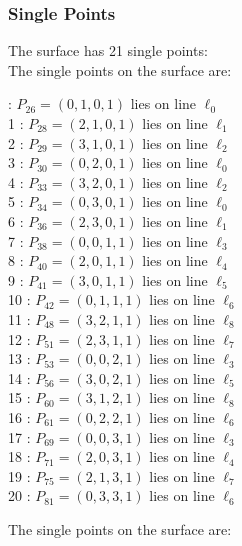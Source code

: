 \documentclass{article}
\begin{document}
{\subsubsection*{Single Points}
The surface has 21 single points:\\
The single points on the surface are:\\
\begin{multicols}{2}
 : $P_{26}=( 0, 1, 0, 1 )$ lies on line $\ell_{0}$\\
1 : $P_{28}=( 2, 1, 0, 1 )$ lies on line $\ell_{1}$\\
2 : $P_{29}=( 3, 1, 0, 1 )$ lies on line $\ell_{2}$\\
3 : $P_{30}=( 0, 2, 0, 1 )$ lies on line $\ell_{0}$\\
4 : $P_{33}=( 3, 2, 0, 1 )$ lies on line $\ell_{2}$\\
5 : $P_{34}=( 0, 3, 0, 1 )$ lies on line $\ell_{0}$\\
6 : $P_{36}=( 2, 3, 0, 1 )$ lies on line $\ell_{1}$\\
7 : $P_{38}=( 0, 0, 1, 1 )$ lies on line $\ell_{3}$\\
8 : $P_{40}=( 2, 0, 1, 1 )$ lies on line $\ell_{4}$\\
9 : $P_{41}=( 3, 0, 1, 1 )$ lies on line $\ell_{5}$\\
10 : $P_{42}=( 0, 1, 1, 1 )$ lies on line $\ell_{6}$\\
11 : $P_{48}=( 3, 2, 1, 1 )$ lies on line $\ell_{8}$\\
12 : $P_{51}=( 2, 3, 1, 1 )$ lies on line $\ell_{7}$\\
13 : $P_{53}=( 0, 0, 2, 1 )$ lies on line $\ell_{3}$\\
14 : $P_{56}=( 3, 0, 2, 1 )$ lies on line $\ell_{5}$\\
15 : $P_{60}=( 3, 1, 2, 1 )$ lies on line $\ell_{8}$\\
16 : $P_{61}=( 0, 2, 2, 1 )$ lies on line $\ell_{6}$\\
17 : $P_{69}=( 0, 0, 3, 1 )$ lies on line $\ell_{3}$\\
18 : $P_{71}=( 2, 0, 3, 1 )$ lies on line $\ell_{4}$\\
19 : $P_{75}=( 2, 1, 3, 1 )$ lies on line $\ell_{7}$\\
20 : $P_{81}=( 0, 3, 3, 1 )$ lies on line $\ell_{6}$\\
\end{multicols}
The single points on the surface are:\\
}
\end{document}

